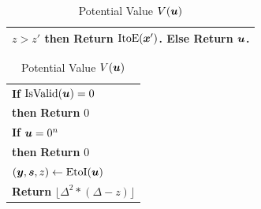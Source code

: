 \begin{table}
\begin{minipage}{0.73\textwidth}
\begin{tabular}{|l|}
\hspace{0pt}{\bf If} $z>z'$ {\bf then} {\bf Return} $\mbox{ItoE}(\mbox{\boldmath $x$}')$. {\bf Else} {\bf Return} $\mbox{\boldmath $u$}$.\\
\hline
\end{tabular}
\end{minipage}%
\hspace{-1cm}
\begin{minipage}{0.23\textwidth}
\caption{Potential Value $\mbox{$V$}(\mbox{\boldmath $u$})$}\label{tab:F}
\begin{tabular}{|l|}
\hline
\hspace{0pt} {\bf If} $\mbox{IsValid}(\mbox{\boldmath $u$})=0$ \\
\hspace{5pt} {\bf then} {\bf Return} $0$\\
\hspace{0pt} {\bf If} $\mbox{\boldmath $u$}=0^n$\\
\hspace{5pt}  {\bf then} {\bf Return} $0$\\
\hspace{0pt} $(\mbox{\boldmath $y$},\mbox{\boldmath $s$},z) \leftarrow \mbox{EtoI}(\mbox{\boldmath $u$})$\\
\hspace{0pt} {\bf Return} $\lfloor \Delta^2*(\Delta -z)\rfloor$\\
\hline
\end{tabular}
\end{minipage}
\end{table}



